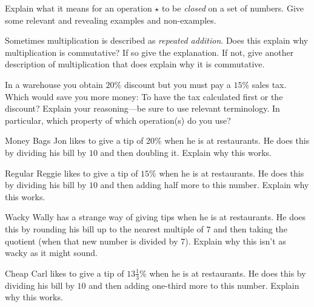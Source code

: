 \documentclass[nooutcomes]{ximera}
\begin{document}
\begin{problem}Explain what it means for an operation $\star$ to be \textit{closed}
  on a set of numbers. Give some relevant and revealing
  examples and non-examples.
\end{problem} 

\begin{problem}Sometimes multiplication is described as \textit{repeated
  addition}. Does this explain why multiplication is commutative? If
  so give the explanation. If not, give another description of
  multiplication that does explain why it is commutative.
\end{problem} 

\begin{problem}In a warehouse you obtain $20\%$ discount but you must pay a
  $15\%$ sales tax. Which would save you more money: To have the tax
  calculated first or the discount? Explain your reasoning---be sure
  to use relevant terminology.  In particular, which property 
of which operation(s) do you use?  
\end{problem} 

\begin{problem}Money Bags Jon likes to give a tip of $20$\% when he is at
  restaurants. He does this by dividing his bill by $10$ and then
  doubling it. Explain why this works.
\end{problem} 

\begin{problem}Regular Reggie likes to give a tip of $15$\% when he is at
  restaurants. He does this by dividing his bill by $10$ and then
  adding half more to this number. Explain why this works.
\end{problem} 

\begin{problem}Wacky Wally has a strange way of giving tips when he is at
  restaurants. He does this by rounding his bill up to the nearest
  multiple of $7$ and then taking the quotient (when that new number
  is divided by $7$). Explain why this isn't as wacky as it might
  sound.
\end{problem} 

\begin{problem}Cheap Carl likes to give a tip of $13\frac{1}{3}$\% when he is
  at restaurants. He does this by dividing his bill by $10$ and then
  adding one-third more to this number. Explain why this works.
\end{problem} 
\end{document}
